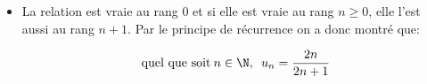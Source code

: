 \begin{enumerate}
\begin{enumerate}
\begin{itemize}
La relation est vraie au rang $n + 1$.
\item La relation est vraie au rang 0 et si elle est vraie au rang $n \geqslant 0$, elle l'est aussi au rang $n + 1$. Par le principe de récurrence on a donc montré que:

\[\text{quel que soit}\: n \in \N,\enskip u_n=\frac{2n}{2n+1}\]
\end{itemize}
	\end{enumerate}
\end{enumerate}
